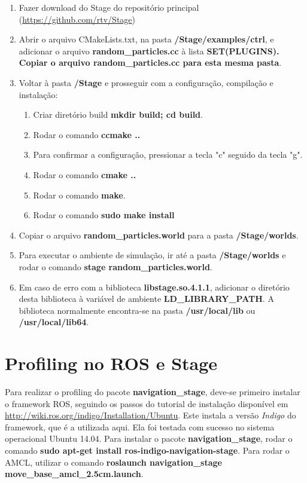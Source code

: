 \documentclass[
	12pt,				%
	openright,			%
	oneside,			%
	a4paper,			%
	english,			%
	french,				%
	spanish,			%
	brazil,				%
	]{abntex2}
\begin{document}
\begin{anexosenv}
\begin{enumerate}
    \item Fazer download do Stage do repositório principal (\url{https://github.com/rtv/Stage})
    \item Abrir o arquivo CMakeLists.txt, na pasta \textbf{/Stage/examples/ctrl}, e adicionar o arquivo \textbf{random\_particles.cc} à lista \textbf{SET(PLUGINS). Copiar o arquivo \textbf{random\_particles.cc} para esta mesma pasta}.
    \item Voltar à pasta \textbf{/Stage} e prosseguir com a configuração, compilação e instalação:
        \begin{enumerate}
            \item Criar diretório build \textbf{mkdir build; cd build}.
            \item Rodar o comando \textbf{ccmake ..}
            \item Para confirmar a configuração, pressionar a tecla "c" seguido da tecla "g".
            \item Rodar o comando \textbf{cmake ..}
            \item Rodar o comando \textbf{make}.
            \item Rodar o comando \textbf{sudo make install}
        \end{enumerate}
    \item Copiar o arquivo \textbf{random\_particles.world} para a pasta \textbf{/Stage/worlds}.
    \item Para executar o ambiente de simulação, ir até a pasta \textbf{/Stage/worlds} e rodar o comando \textbf{stage random\_particles.world}.
    \item Em caso de erro com a biblioteca \textbf{libstage.so.4.1.1}, adicionar o diretório desta biblioteca à variável de ambiente \textbf{LD\_LIBRARY\_PATH}. A biblioteca normalmente encontra-se na pasta \textbf{/usr/local/lib} ou \textbf{/usr/local/lib64}.
\end{enumerate}


\chapter{Profiling no ROS e Stage}

Para realizar o profiling do pacote \textbf{navigation\_stage}, deve-se primeiro instalar o framework ROS, seguindo os passos do tutorial de instalação disponível em \url{http://wiki.ros.org/indigo/Installation/Ubuntu}. Este instala a versão \emph{Indigo} do framework, que é a utilizada aqui. Ela foi testada com sucesso no sistema operacional Ubuntu 14.04. Para instalar o pacote \textbf{navigation\_stage}, rodar o comando \textbf{sudo apt-get install ros-indigo-navigation-stage}. Para rodar o AMCL, utilizar o comando \textbf{roslaunch navigation\_stage move\_base\_amcl\_2.5cm.launch}.\par


\end{anexosenv}
\end{document}
